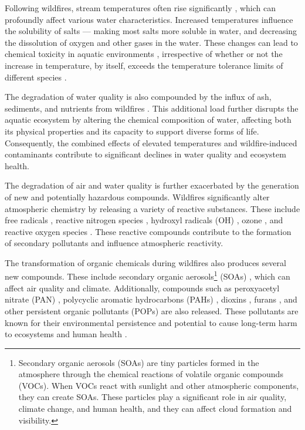 \documentclass[
  12 pt,
]{Nemilov}
\begin{document}
Following wildfires, stream temperatures often rise significantly \citep{rhoades2011influence}, which can profoundly affect various water characteristics. Increased temperatures influence the solubility of salts --- making most salts more soluble in water, and decreasing the dissolution of oxygen and other gases in the water. These changes can lead to chemical toxicity in aquatic environments \citep{hitt2003immediate}, irrespective of whether or not the increase in temperature, by itself, exceeds the temperature tolerance limits of different species \citep{isaak2010effects, meador2007quantifying}.

The degradation of water quality is also compounded by the influx of ash, sediments, and nutrients from wildfires \citep{smith2011wildfire}. This additional load further disrupts the aquatic ecosystem by altering the chemical composition of water, affecting both its physical properties and its capacity to support diverse forms of life. Consequently, the combined effects of elevated temperatures and wildfire-induced contaminants contribute to significant declines in water quality and ecosystem health.

The degradation of air and water quality is further exacerbated by the generation of new and potentially hazardous compounds. Wildfires significantly alter atmospheric chemistry by releasing a variety of reactive substances. These include free radicals \citep{leonard2007particle, sigmund2021environmentally}, reactive nitrogen species \citep{benedict2017enhanced, lindaas2021emissions}, hydroxyl radicals (OH) \citep{fang2023wildfire}, ozone \citep{jaffe2012ozone}, and reactive oxygen species \citep{fang2023wildfire}. These reactive compounds contribute to the formation of secondary pollutants and influence atmospheric reactivity.

The transformation of organic chemicals during wildfires also produces several new compounds. These include secondary organic aerosols\footnote{Secondary organic aerosols (SOAs) are tiny particles formed in the atmosphere through the chemical reactions of volatile organic compounds (VOCs). When VOCs react with sunlight and other atmospheric components, they can create SOAs. These particles play a significant role in air quality, climate change, and human health, and they can affect cloud formation and visibility.} (SOAs) \citep{liang2022emissions, tomaz2018photochemical}, which can affect air quality and climate. Additionally, compounds such as peroxyacetyl nitrate (PAN) \citep{peng2021observations}, polycyclic aromatic hydrocarbons (PAHs) \citep{kieta2022polycyclic}, dioxins \citep{ward2006concentrations}, furans \citep{newland2022no}, and other persistent organic pollutants (POPs) \citep{gong2021forest} are also released. These pollutants are known for their environmental persistence and potential to cause long-term harm to ecosystems and human health \citep{alharbi2018health, qing2006persistent}.
\end{document}
